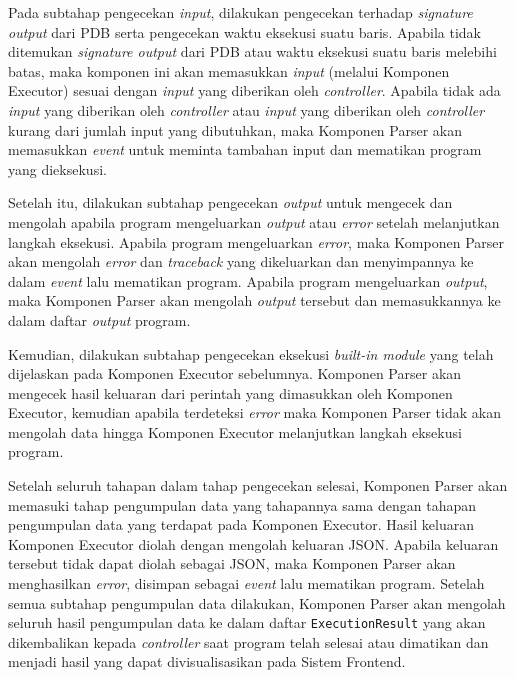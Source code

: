 Pada subtahap pengecekan \textit{input}, dilakukan pengecekan terhadap \textit{signature output} dari PDB serta pengecekan waktu eksekusi suatu baris. Apabila tidak ditemukan \textit{signature output} dari PDB atau waktu eksekusi suatu baris melebihi batas, maka komponen ini akan memasukkan \textit{input} (melalui Komponen Executor) sesuai dengan \textit{input} yang diberikan oleh \textit{controller}. Apabila tidak ada \textit{input} yang diberikan oleh \textit{controller} atau \textit{input} yang diberikan oleh \textit{controller} kurang dari jumlah input yang dibutuhkan, maka Komponen Parser akan memasukkan \textit{event} untuk meminta tambahan input dan mematikan program yang dieksekusi.

Setelah itu, dilakukan subtahap pengecekan \textit{output} untuk mengecek dan mengolah apabila program mengeluarkan \textit{output} atau \textit{error} setelah melanjutkan langkah eksekusi. Apabila program mengeluarkan \textit{error}, maka Komponen Parser akan mengolah \textit{error} dan \textit{traceback} yang dikeluarkan dan menyimpannya ke dalam \textit{event} lalu mematikan program. Apabila program mengeluarkan \textit{output}, maka Komponen Parser akan mengolah \textit{output} tersebut dan memasukkannya ke dalam daftar \textit{output} program.

Kemudian, dilakukan subtahap pengecekan eksekusi \textit{built-in module} yang telah dijelaskan pada Komponen Executor sebelumnya. Komponen Parser akan mengecek hasil keluaran dari perintah yang dimasukkan oleh Komponen Executor, kemudian apabila terdeteksi \textit{error} maka Komponen Parser tidak akan mengolah data hingga Komponen Executor melanjutkan langkah eksekusi program.

Setelah seluruh tahapan dalam tahap pengecekan selesai, Komponen Parser akan memasuki tahap pengumpulan data yang tahapannya sama dengan tahapan pengumpulan data yang terdapat pada Komponen Executor. Hasil keluaran Komponen Executor diolah dengan mengolah keluaran JSON. Apabila keluaran tersebut tidak dapat diolah sebagai JSON, maka Komponen Parser akan menghasilkan \textit{error}, disimpan sebagai \textit{event} lalu mematikan program. Setelah semua subtahap pengumpulan data dilakukan, Komponen Parser akan mengolah seluruh hasil pengumpulan data ke dalam daftar \verb|ExecutionResult| yang akan dikembalikan kepada \textit{controller} saat program telah selesai atau dimatikan dan menjadi hasil yang dapat divisualisasikan pada Sistem Frontend.


